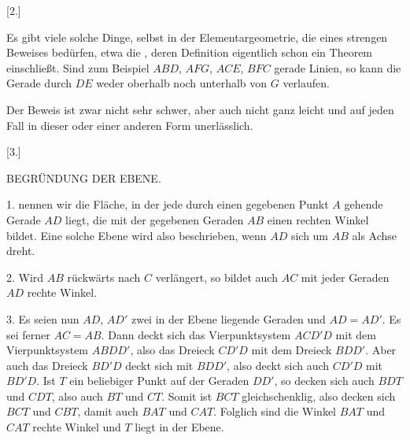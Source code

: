 \begin{center}[2.]\end{center}


Es gibt viele solche Dinge, selbst in der Elementargeometrie, die eines strengen
Beweises bedürfen, etwa die , deren Definition eigentlich
schon ein Theorem einschließt. Sind zum Beispiel $ABD$, $AFG$, $ACE$, $BFC$ gerade Linien,
so kann die Gerade durch $DE$ weder oberhalb noch unterhalb von $G$
verlaufen.

\begin{center}

\end{center}

Der Beweis ist zwar nicht sehr schwer, aber auch nicht ganz leicht und auf
jeden Fall in dieser oder einer anderen Form unerlässlich.



\begin{center}[3.]\end{center}


\begin{center}BEGRÜNDUNG DER EBENE.\end{center}


1.  nennen wir die Fläche, in der jede durch einen gegebenen Punkt $A$
gehende Gerade $AD$ liegt, die mit der gegebenen Geraden $AB$ einen rechten
Winkel bildet. Eine solche Ebene wird also beschrieben, wenn $AD$ sich um $AB$
als Achse dreht.

2. Wird $AB$ rückwärts nach $C$ verlängert, so bildet auch $AC$ mit jeder Geraden $AD$
rechte Winkel.

\begin{center}

\end{center}

3. Es seien nun $AD$, $AD'$ zwei in der Ebene liegende Geraden und $AD = AD'$. Es
sei ferner $AC = AB$. Dann deckt sich das Vierpunktsystem $ACD'D$ mit dem
Vierpunktsystem $ABDD'$, also das Dreieck $CD'D$ mit dem Dreieck $BDD'$.
Aber auch das Dreieck $BD'D$ deckt sich mit $BDD'$, also deckt sich auch $CD'D$ mit $BD'D$. Ist
$T$ ein beliebiger Punkt auf der Geraden $DD'$, so decken sich auch $BDT$ und
$CDT$, also auch $BT$ und $CT$. Somit ist $BCT$ gleichschenklig, also decken sich
$BCT$ und $CBT$, damit auch $BAT$ und $CAT$. Folglich sind die Winkel $BAT$ und $CAT$
rechte Winkel und $T$ liegt in der Ebene.

